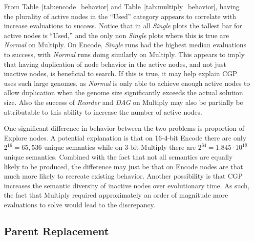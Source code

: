 \documentclass[journal]{IEEEtran}
\begin{document}
From Table~\ref{tab:encode_behavior} and Table~\ref{tab:multiply_behavior}, having
the plurality of active nodes in the ``Used'' category appears to correlate with
increase evaluations to success.  Notice that in all \emph{Single} plots the
tallest bar for active nodes is ``Used,'' and the only non \emph{Single} plots
where this is true are \emph{Normal} on Multiply.  On Encode, \emph{Single}
runs had the highest median evaluations to success, with \emph{Normal} runs
doing similarly on Multiply.  This appears to imply that having duplication
of node behavior in the active nodes, and not just inactive nodes, is beneficial
to search.  If this is true, it may help explain CGP uses such large genomes,
as \emph{Normal} is only able to achieve enough active nodes to allow duplication
when the genome size significantly exceeds the actual solution size.  Also
the success of \emph{Reorder} and \emph{DAG} on Multiply may also be partially be attributable
to this ability to increase the number of active nodes.

One significant difference in behavior between the two problems is proportion of
Explore nodes.  A potential explanation is that on 16-4-bit Encode there are only
$2^{16} = 65,536$ unique semantics while on 3-bit Multiply there are $2^{64} = 1.845\cdot 10^{19}$
unique semantics.  Combined with the fact that not all semantics are equally
likely to be produced, the difference may just be that on Encode nodes are
that much more likely to recreate existing behavior.  Another possibility is that
CGP increases the semantic diversity of inactive nodes over evolutionary time.
As such, the fact that Multiply required approximately an order of magnitude more
evaluations to solve would lead to the discrepancy.

\subsection{Parent Replacement}
\end{document}
